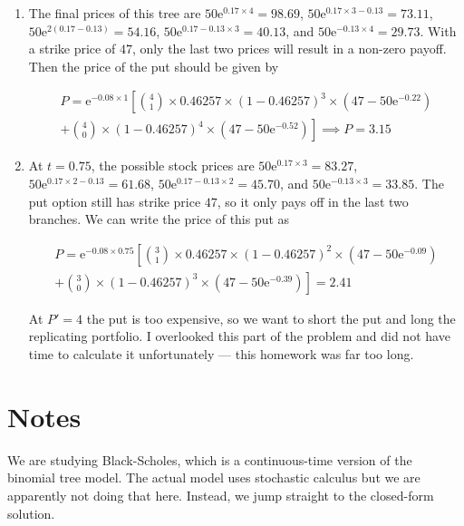 \documentclass[12pt, letterpaper]{article}
\newcommand{\e}{\mathrm{e}}
\begin{document}
\begin{enumerate}
        \item The final prices of this tree are \(50 \e^{0.17 \times 4 } = 98.69\), \(50 \e^{0.17 \times 3 - 0.13} =  73.11 \), \\ \(50 \e^{2(0.17 - 0.13) } = 54.16\), \(50 \e^{0.17 - 0.13 \times 3 } = 40.13\), and \(50 \e^{-0.13 \times 4} = 29.73\). With a strike price of \(47\), only the last two prices will result in a non-zero payoff. Then the price of the put should be given by
        
        \begin{align*}
        P = \e^{-0.08 \times 1} \left[ \binom{4}{1} \times 0.46257 \times (1 - 0.46257)^3 \times \left(47 - 50 \e^{-0.22}\right) \right. \\ \left. + \binom{4}{0} \times (1 - 0.46257)^4 \times \left(47 - 50 \e^{-0.52}\right) \right] \implies \boxed{P = 3.15}
        \end{align*}

        \item At \(t = 0.75\), the possible stock prices are \(50 \e^{0.17 \times 3} = 83.27\), \(50 \e^{0.17 \times 2 - 0.13} = 61.68\), \(50 \e^{0.17 - 0.13 \times 2} = 45.70\), and \(50 \e^{-0.13 \times 3} = 33.85\). The put option still has strike price \(47\), so it only pays off in the last two branches. We can write the price of this put as 
        
        \begin{align*}
        P = \e^{-0.08 \times 0.75} \left[ \binom{3}{1} \times 0.46257 \times (1 - 0.46257)^2 \times \left(47 - 50 \e^{-0.09}\right) \right. \\ \left. + \binom{3}{0} \times (1 - 0.46257)^3 \times \left(47 - 50 \e^{-0.39}\right) \right] = 2.41
        \end{align*}

        At \(P' = 4\) the put is too expensive, so we want to short the put and long the replicating portfolio. I overlooked this part of the problem and did not have time to calculate it unfortunately --- this homework was far too long.
        


    \end{enumerate}

    \section{Notes}

    We are studying Black-Scholes, which is a continuous-time version of the binomial tree model. The actual model uses stochastic calculus but we are apparently not doing that here. Instead, we jump straight to the closed-form solution. 
    
\end{document}
